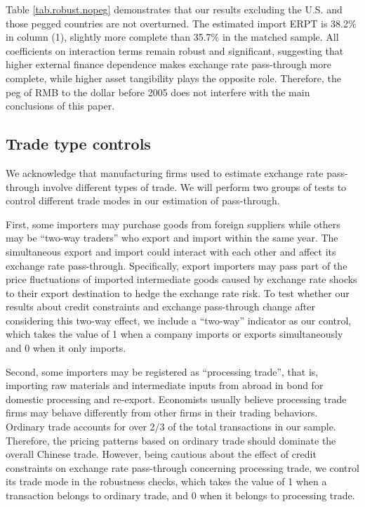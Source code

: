 \documentclass[12pt]{article}
\begin{document}
Table \ref{tab.robust.nopeg} demonstrates that our results excluding the U.S. and those pegged countries are not overturned. The estimated import ERPT is 38.2\% in column (1), slightly more complete than 35.7\% in the matched sample. All coefficients on interaction terms remain robust and significant, suggesting that higher external finance dependence makes exchange rate pass-through more complete, while higher asset tangibility plays the opposite role. Therefore, the peg of RMB to the dollar before 2005 does not interfere with the main conclusions of this paper.

\subsection{Trade type controls}

We acknowledge that manufacturing firms used to estimate exchange rate pass-through involve different types of trade. We will perform two groups of tests to control different trade modes in our estimation of pass-through.

First, some importers may purchase goods from foreign suppliers while others may be ``two-way traders'' who export and import within the same year. The simultaneous export and import could interact with each other and affect its exchange rate pass-through. Specifically, export importers may pass part of the price fluctuations of imported intermediate goods caused by exchange rate shocks to their export destination to hedge the exchange rate risk. To test whether our results about credit constraints and exchange pass-through change after considering this two-way effect, we include a ``two-way'' indicator as our control, which takes the value of 1 when a company imports or exports simultaneously and 0 when it only imports.

Second, some importers may be registered as ``processing trade'', that is, importing raw materials and intermediate inputs from abroad in bond for domestic processing and re-export. Economists usually believe processing trade firms may behave differently from other firms in their trading behaviors. Ordinary trade accounts for over 2/3 of the total transactions in our sample. Therefore, the pricing patterns based on ordinary trade should dominate the overall Chinese trade. However, being cautious about the effect of credit constraints on exchange rate pass-through concerning processing trade, we control its trade mode in the robustness checks, which takes the value of 1 when a transaction belongs to ordinary trade, and 0 when it belongs to processing trade.
\end{document}
